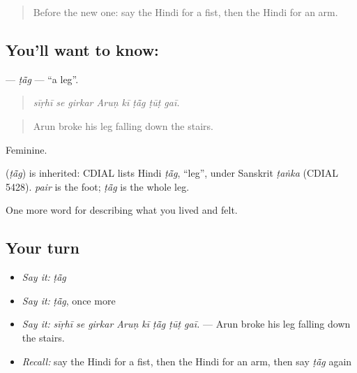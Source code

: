 \label{lesson:HI-C477-tag}



\begin{quote}
Before the new one: say the Hindi for a fist, then the Hindi for an arm.
\end{quote}

\subsection*{You'll want to know: }
\textbf{} — \emph{ṭā̃g} — \textquotedblleft{}a leg\textquotedblright{}.

\begin{quote}
       
\end{quote}

\begin{quote}
\emph{sīṛhī se girkar Aruṇ kī ṭā̃g ṭūṭ gaī.}
\end{quote}

\begin{quote}
Arun broke his leg falling down the stairs.
\end{quote}

Feminine.

\begin{cousinweb}
\textbf{} (\emph{ṭā̃g}) is inherited: CDIAL lists Hindi \emph{ṭā̃g}, \textquotedblleft{}leg\textquotedblright{}, under Sanskrit \emph{ṭaṅka} (CDIAL 5428). \emph{pair} is the foot; \emph{ṭā̃g} is the whole leg.
\end{cousinweb}

\begin{grammarlens}[title={What you've built}]
One more word for describing what you lived and felt.
\end{grammarlens}

\subsection*{Your turn}
\begin{itemize}
\raggedright
  \item \emph{Say it:} \emph{ṭā̃g}
  \item \emph{Say it:} \emph{ṭā̃g}, once more
  \item \emph{Say it:} \emph{sīṛhī se girkar Aruṇ kī ṭā̃g ṭūṭ gaī.} — Arun broke his leg falling down the stairs.
  \item \emph{Recall:} say the Hindi for a fist, then the Hindi for an arm, then say \emph{ṭā̃g} again
\end{itemize}


